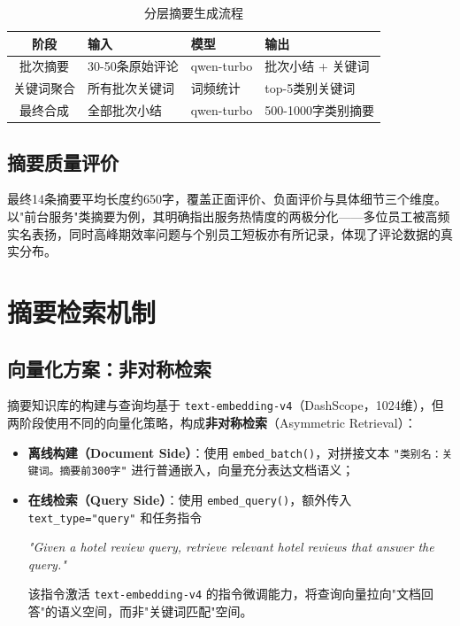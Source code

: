 \documentclass[11pt, a4paper]{article}
\begin{document}
\begin{table}[H]
\centering
\caption{分层摘要生成流程}
\label{tab:gen}
\setlength{\tabcolsep}{6pt}
\begin{tabular}{clll}
\toprule
\textbf{阶段} & \textbf{输入} & \textbf{模型} & \textbf{输出} \\
\midrule
批次摘要 & 30-50条原始评论 & qwen-turbo & 批次小结 + 关键词 \\
关键词聚合 & 所有批次关键词 & 词频统计 & top-5类别关键词 \\
最终合成 & 全部批次小结 & qwen-turbo & 500-1000字类别摘要 \\
\bottomrule
\end{tabular}
\end{table}

\subsection{摘要质量评价}

最终14条摘要平均长度约650字，覆盖正面评价、负面评价与具体细节三个维度。以"前台服务"类摘要为例，其明确指出服务热情度的两极分化——多位员工被高频实名表扬，同时高峰期效率问题与个别员工短板亦有所记录，体现了评论数据的真实分布。

\section{摘要检索机制}

\subsection{向量化方案：非对称检索}

摘要知识库的构建与查询均基于 \texttt{text-embedding-v4}（DashScope，1024维），但两阶段使用不同的向量化策略，构成\textbf{非对称检索}（Asymmetric Retrieval）：

\begin{itemize}[leftmargin=2em]
  \item \textbf{离线构建（Document Side）}：使用 \texttt{embed\_batch()}，对拼接文本 \texttt{"类别名：关键词。摘要前300字"} 进行普通嵌入，向量充分表达文档语义；
  \item \textbf{在线检索（Query Side）}：使用 \texttt{embed\_query()}，额外传入 \texttt{text\_type="query"} 和任务指令
    \begin{center}
    \textit{"Given a hotel review query, retrieve relevant hotel reviews that answer the query."}
    \end{center}
    该指令激活 \texttt{text-embedding-v4} 的指令微调能力，将查询向量拉向"文档回答"的语义空间，而非"关键词匹配"空间。
\end{itemize}
\end{document}
